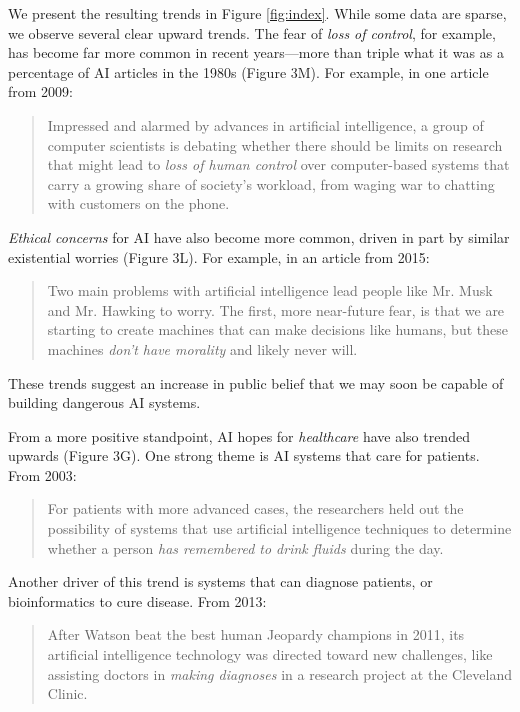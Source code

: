 \documentclass[letterpaper]{article}
\begin{document}
We present the resulting trends in Figure \ref{fig:index}. While some data are sparse, we observe several clear upward trends. The fear of \textit{loss of control}, for example, has become far more common in recent years---more than triple what it was as a percentage of AI articles in the 1980s (Figure 3M). For example, in one article from 2009:
\begin{quote}
\small
Impressed and alarmed by advances in artificial intelligence, a group of computer scientists is debating whether there should be limits on research that might lead to \textit{loss of human control} over computer-based systems that carry a growing share of society's workload, from waging war to chatting with customers on the phone.
\normalsize
\end{quote}
\textit{Ethical concerns} for AI have also become more common, driven in part by similar existential worries (Figure 3L). For example, in an article from 2015:
\begin{quote}
\small
Two main problems with artificial intelligence lead people like Mr. Musk and Mr. Hawking to worry. The first, more near-future fear, is that we are starting to create machines that can make decisions like humans, but these machines \textit{don't have morality} and likely never will.
\normalsize
\end{quote}
These trends suggest an increase in public belief that we may soon be capable of building dangerous AI systems.

From a more positive standpoint, AI hopes for \textit{healthcare} have also trended upwards (Figure 3G). One strong theme is AI systems that care for patients. From 2003:
\begin{quote}
\small
For patients with more advanced cases, the researchers held out the possibility of systems that use artificial intelligence techniques to determine whether a person \textit{has remembered to drink fluids} during the day.
\normalsize
\end{quote}
Another driver of this trend is systems that can diagnose patients, or bioinformatics to cure disease. From 2013:
\begin{quote}
\small
After Watson beat the best human Jeopardy champions in 2011, its artificial intelligence technology was directed toward new challenges, like assisting doctors in \textit{making diagnoses} in a research project at the Cleveland Clinic.
\normalsize
\end{quote}
\end{document}
